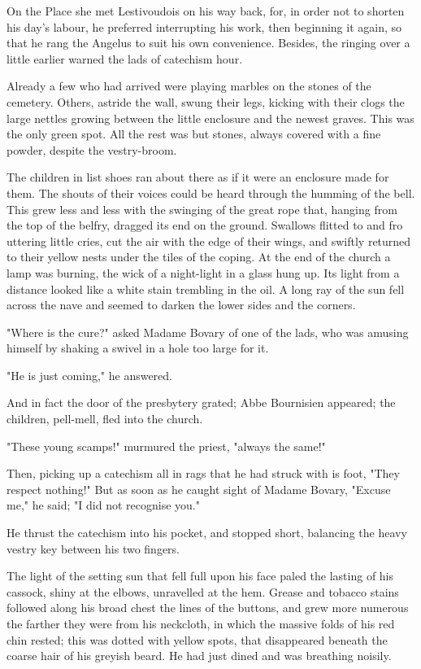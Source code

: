 \documentclass{tufte-book}
\begin{document}
On the Place she met Lestivoudois on his way back, for, in order not
to shorten his day's labour, he preferred interrupting his work,
then beginning it again, so that he rang the Angelus to suit his own
convenience. Besides, the ringing over a little earlier warned the lads
of catechism hour.

Already a few who had arrived were playing marbles on the stones of the
cemetery. Others, astride the wall, swung their legs, kicking with their
clogs the large nettles growing between the little enclosure and the
newest graves. This was the only green spot. All the rest was but
stones, always covered with a fine powder, despite the vestry-broom.

The children in list shoes ran about there as if it were an enclosure
made for them. The shouts of their voices could be heard through the
humming of the bell. This grew less and less with the swinging of the
great rope that, hanging from the top of the belfry, dragged its end on
the ground. Swallows flitted to and fro uttering little cries, cut the
air with the edge of their wings, and swiftly returned to their yellow
nests under the tiles of the coping. At the end of the church a lamp was
burning, the wick of a night-light in a glass hung up. Its light from a
distance looked like a white stain trembling in the oil. A long ray of
the sun fell across the nave and seemed to darken the lower sides and
the corners.

"Where is the cure?" asked Madame Bovary of one of the lads, who was
amusing himself by shaking a swivel in a hole too large for it.

"He is just coming," he answered.

And in fact the door of the presbytery grated; Abbe Bournisien appeared;
the children, pell-mell, fled into the church.

"These young scamps!" murmured the priest, "always the same!"

Then, picking up a catechism all in rags that he had struck with is
foot, "They respect nothing!" But as soon as he caught sight of Madame
Bovary, "Excuse me," he said; "I did not recognise you."

He thrust the catechism into his pocket, and stopped short, balancing
the heavy vestry key between his two fingers.

The light of the setting sun that fell full upon his face paled the
lasting of his cassock, shiny at the elbows, unravelled at the hem.
Grease and tobacco stains followed along his broad chest the lines
of the buttons, and grew more numerous the farther they were from his
neckcloth, in which the massive folds of his red chin rested; this was
dotted with yellow spots, that disappeared beneath the coarse hair of
his greyish beard. He had just dined and was breathing noisily.
\end{document}
